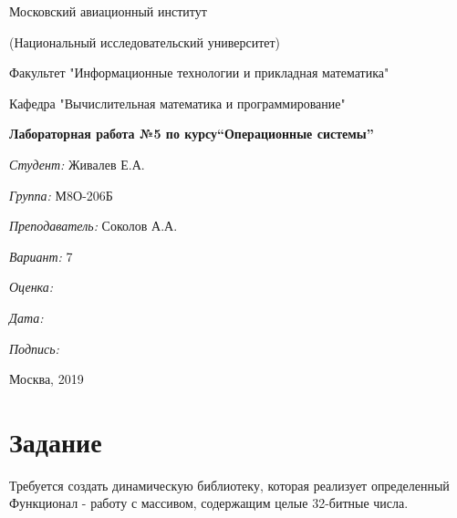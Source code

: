\documentclass[a4paper, 12pt]{article}
\begin{document}
\thispagestyle{empty}	
\begin{center}
	Московский авиационный институт
	
	(Национальный исследовательский университет)
	
	Факультет "Информационные технологии и прикладная математика"
	
	Кафедра "Вычислительная математика и программирование"
	
\end{center}
\vspace{40ex}
\begin{center}
	\textbf{\large{Лабораторная работа №5 по курсу\linebreak \textquotedblleft Операционные системы\textquotedblright}}
\end{center}
\vspace{35ex}
\begin{flushright}
	\textit{Студент: } Живалев Е.А.
	
	\vspace{2ex}
	\textit{Группа: } М8О-206Б
	
	\vspace{2ex}
	\textit{Преподаватель: } Соколов А.А.
	
	\vspace{2ex}
	\textit{Вариант: } 7
	
	\vspace{2ex}
	\textit{Оценка: } \underline{\quad\quad\quad\quad\quad\quad}
	
	 \vspace{2ex}
	\textit{Дата: } \underline{\quad\quad\quad\quad\quad\quad}
	
	\vspace{2ex}
	\textit{Подпись: } \underline{\quad\quad\quad\quad\quad\quad}
	
\end{flushright}

\vspace{5ex}

\begin{vfill}
	\begin{center}
		Москва, 2019
	\end{center}	
\end{vfill}
\newpage

\section{Задание}

Требуется создать динамическую библиотеку, которая реализует определенный Функционал - работу с массивом, содержащим целые 32-битные числа.
\end{document}
